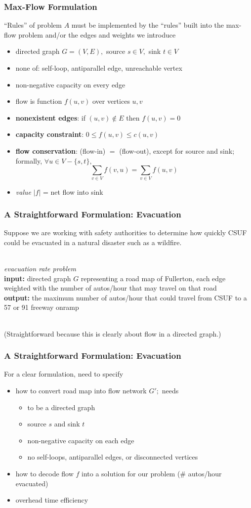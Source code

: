 \documentclass[10pt,aspectratio=169]{beamer}
\newcommand{\stanza}{ \\~\ }
\begin{document}
\begin{frame} \frametitle{Max-Flow Formulation}
``Rules'' of problem $A$ must be implemented by the ``rules'' built
  into the max-flow problem and/or the edges and weights we introduce
\begin{itemize}
  \item directed graph $G=(V, E),$ source $s \in V,$ sink $t \in V$
  \item none of: self-loop, antiparallel edge, unreachable vertex
  \item non-negative capacity on every edge
  \item flow is function $f(u, v)$ over vertices $u, v$
  \item \textbf{nonexistent edges}: if $(u, v) \notin E$ then $f(u, v) = 0$
  \item \textbf{capacity constraint}: $0 \leq f(u, v) \leq c(u, v)$
  \item \textbf{flow conservation}: (flow-in) $=$ (flow-out), except for source and
    sink; formally, $\forall u \in V - \{s, t\},$
    \[ \sum_{v \in V} f(v, u) = \sum_{v \in V} f(u, v) \]
  \item \emph{value} $|f|$ = net flow into sink
  \end{itemize}
\end{frame}

\begin{frame} \frametitle{A Straightforward Formulation: Evacuation}
Suppose we are working with safety authorities to determine how quickly CSUF
could be evacuated in a natural disaster such as a wildfire. \stanza

\emph{evacuation rate problem} \\
\textbf{input:} directed graph $G$ representing a road map of Fullerton, each edge
weighted with the number of autos/hour that may travel on that road \\
\textbf{output:} the maximum number of autos/hour that could travel from CSUF to
a 57 or 91 freeway onramp \stanza

(Straightforward because this is clearly about flow in a directed graph.)
\end{frame}

\begin{frame} \frametitle{A Straightforward Formulation: Evacuation}
For a clear formulation, need to specify
\begin{itemize}
  \item how to convert road map into flow network $G';$ needs
  \begin{itemize}
    \item to be a directed graph
    \item source $s$ and sink $t$
    \item non-negative capacity on each edge
    \item no self-loops, antiparallel edges, or disconnected vertices
  \end{itemize}
  \item how to decode flow $f$ into a solution for our problem (\# autos/hour evacuated)
  \item overhead time efficiency
\end{itemize}
\end{frame}
\end{document}
